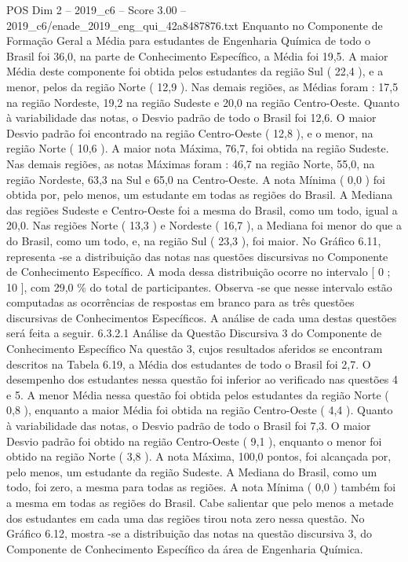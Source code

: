 \begin{textsample}{POS Dim 2 – 2019\_c6 – Score 3.00 – 2019\_c6/enade\_2019\_eng\_qui\_42a8487876.txt}
Enquanto no Componente de Formação Geral a Média para estudantes de Engenharia Química de todo o Brasil foi 36,0, na parte de Conhecimento Específico, a Média foi 19,5.
A maior Média deste componente foi obtida pelos estudantes da região Sul ( 22,4 ), e a menor, pelos da região Norte ( 12,9 ).
Nas demais regiões, as Médias foram : 17,5 na região Nordeste, 19,2 na região Sudeste e 20,0 na região Centro-Oeste.
Quanto à variabilidade das notas, o Desvio padrão de todo o Brasil foi 12,6.
O maior Desvio padrão foi encontrado na região Centro-Oeste ( 12,8 ), e o menor, na região Norte ( 10,6 ).
A maior nota Máxima, 76,7, foi obtida na região Sudeste.
Nas demais regiões, as notas Máximas foram : 46,7 na região Norte, 55,0, na região Nordeste, 63,3 na Sul e 65,0 na Centro-Oeste.
A nota Mínima ( 0,0 ) foi obtida por, pelo menos, um estudante em todas as regiões do Brasil.
A Mediana das regiões Sudeste e Centro-Oeste foi a mesma do Brasil, como um todo, igual a 20,0.
Nas regiões Norte ( 13,3 ) e Nordeste ( 16,7 ), a Mediana foi menor do que a do Brasil, como um todo, e, na região Sul ( 23,3 ), foi maior.
No Gráfico 6.11, representa -se a distribuição das notas nas questões discursivas no Componente de Conhecimento Específico.
A moda dessa distribuição ocorre no intervalo [ 0 ; 10 ], com 29,0 \% do total de participantes.
Observa -se que nesse intervalo estão computadas as ocorrências de respostas em branco para as três questões discursivas de Conhecimentos Específicos.
A análise de cada uma destas questões será feita a seguir. 6.3.2.1 Análise da Questão Discursiva 3 do Componente de Conhecimento Específico Na questão 3, cujos resultados aferidos se encontram descritos na Tabela 6.19, a Média dos estudantes de todo o Brasil foi 2,7.
O desempenho dos estudantes nessa questão foi inferior ao verificado nas questões 4 e 5.
A menor Média nessa questão foi obtida pelos estudantes da região Norte ( 0,8 ), enquanto a maior Média foi obtida na região Centro-Oeste ( 4,4 ).
Quanto à variabilidade das notas, o Desvio padrão de todo o Brasil foi 7,3.
O maior Desvio padrão foi obtido na região Centro-Oeste ( 9,1 ), enquanto o menor foi obtido na região Norte ( 3,8 ).
A nota Máxima, 100,0 pontos, foi alcançada por, pelo menos, um estudante da região Sudeste.
A Mediana do Brasil, como um todo, foi zero, a mesma para todas as regiões.
A nota Mínima ( 0,0 ) também foi a mesma em todas as regiões do Brasil.
Cabe salientar que pelo menos a metade dos estudantes em cada uma das regiões tirou nota zero nessa questão.
No Gráfico 6.12, mostra -se a distribuição das notas na questão discursiva 3, do Componente de Conhecimento Específico da área de Engenharia Química.

\end{textsample}
